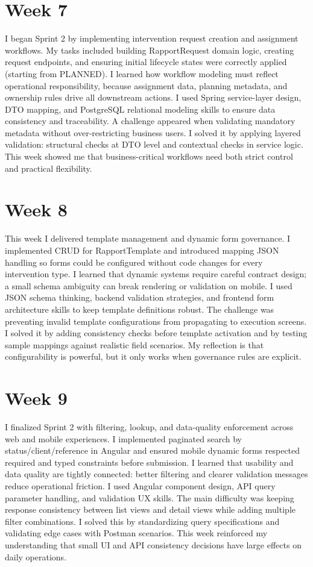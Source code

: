 \section*{Week 7}
I began Sprint 2 by implementing intervention request creation and assignment workflows. My tasks included building RapportRequest domain logic, creating request endpoints, and ensuring initial lifecycle states were correctly applied (starting from PLANNED). I learned how workflow modeling must reflect operational responsibility, because assignment data, planning metadata, and ownership rules drive all downstream actions. I used Spring service-layer design, DTO mapping, and PostgreSQL relational modeling skills to ensure data consistency and traceability. A challenge appeared when validating mandatory metadata without over-restricting business users. I solved it by applying layered validation: structural checks at DTO level and contextual checks in service logic. This week showed me that business-critical workflows need both strict control and practical flexibility.

\section*{Week 8}
This week I delivered template management and dynamic form governance. I implemented CRUD for RapportTemplate and introduced mapping JSON handling so forms could be configured without code changes for every intervention type. I learned that dynamic systems require careful contract design; a small schema ambiguity can break rendering or validation on mobile. I used JSON schema thinking, backend validation strategies, and frontend form architecture skills to keep template definitions robust. The challenge was preventing invalid template configurations from propagating to execution screens. I solved it by adding consistency checks before template activation and by testing sample mappings against realistic field scenarios. My reflection is that configurability is powerful, but it only works when governance rules are explicit.

\section*{Week 9}
I finalized Sprint 2 with filtering, lookup, and data-quality enforcement across web and mobile experiences. I implemented paginated search by status/client/reference in Angular and ensured mobile dynamic forms respected required and typed constraints before submission. I learned that usability and data quality are tightly connected: better filtering and clearer validation messages reduce operational friction. I used Angular component design, API query parameter handling, and validation UX skills. The main difficulty was keeping response consistency between list views and detail views while adding multiple filter combinations. I solved this by standardizing query specifications and validating edge cases with Postman scenarios. This week reinforced my understanding that small UI and API consistency decisions have large effects on daily operations.

